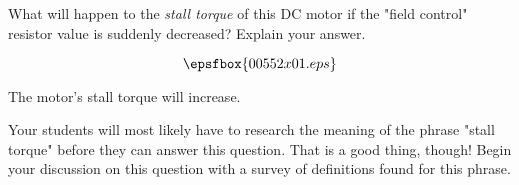 

What will happen to the {\it stall torque} of this DC motor if the "field control" resistor value is suddenly decreased?  Explain your answer.

$$\epsfbox{00552x01.eps}$$







The motor's stall torque will increase.







Your students will most likely have to research the meaning of the phrase "stall torque" before they can answer this question.  That is a good thing, though!  Begin your discussion on this question with a survey of definitions found for this phrase.




